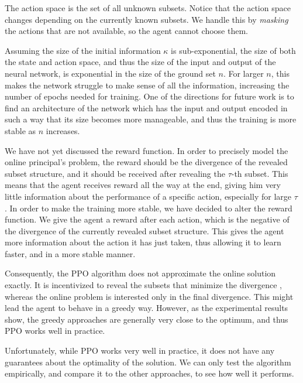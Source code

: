 The action space is the set of all unknown subsets.
Notice that the action space changes depending on the currently known subsets.
We handle this by \emph{masking} the actions that are not available, so the agent cannot choose them.

Assuming the size of the initial information $ \kappa $ is sub-exponential, the size of both the state and action space, and thus the size of the input and output of the neural network, is exponential in the size of the ground set $ n $.
For larger $ n $, this makes the network struggle to make sense of all the information, increasing the number of epochs needed for training.
One of the directions for future work is to find an architecture of the network which has the input and output encoded in such a way that its size becomes more manageable, and thus the training is more stable as $ n $ increases.

We have not yet discussed the reward function.
In order to precisely model the online principal's problem, the reward should be the divergence of the revealed subset structure, and it should be received after revealing the $ \tau $-th subset.
This means that the agent receives reward all the way at the end, giving him very little information about the performance of a specific action, especially for large $ \tau $.
In order to make the training more stable, we have decided to alter the reward function.
We give the agent a reward after each action, which is the negative of the divergence of the currently revealed subset structure.
This gives the agent more information about the action it has just taken, thus allowing it to learn faster, and in a more stable manner.

Consequently, the PPO algorithm does not approximate the online solution exactly.
It is incentivized to reveal the subsets that minimize the divergence , whereas the online problem is interested only in the final divergence.
This might lead the agent to behave in a greedy way.
However, as the experimental results show, the greedy approaches are generally very close to the optimum, and thus PPO works well in practice.

Unfortunately, while PPO works very well in practice, it does not have any guarantees about the optimality of the solution.
We can only test the algorithm empirically, and compare it to the other approaches, to see how well it performs.
